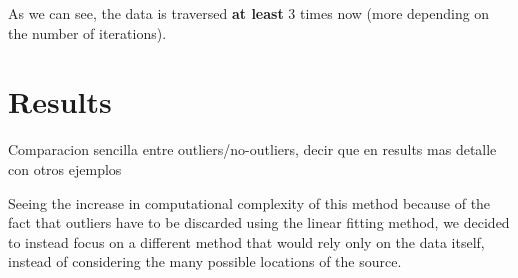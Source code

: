 As we can see, the data is traversed \textbf{at least} 3 times now (more depending on the number of iterations).

\section{Results}

Comparacion sencilla entre outliers/no-outliers, decir que en results mas detalle con otros ejemplos

Seeing the increase in computational complexity of this method because of the fact that outliers have to be discarded using the linear fitting method, we decided to instead focus on a different method that would rely only on the data itself, instead of considering the many possible locations of the source.
